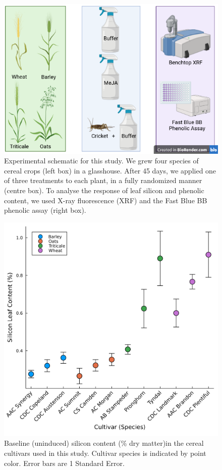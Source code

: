 \documentclass[12pt, letterpaper, ]{report}
\begin{document}
\begin{figure}[ht]
        \includegraphics[width = \textwidth]{images/Induction_schematic.png}
        \centering
        \caption{Experimental schematic for this study. We grew four species of cereal crops (left box) in a glasshouse. After 45 days, we applied one of three treatments to each plant, in a fully randomized manner (centre box). To analyse the response of leaf silicon and phenolic content, we used X-ray fluorescence (XRF) and the Fast Blue BB phenolic assay (right box).}
        \label{Fig:exp_design}
\end{figure}

\begin{figure}[h]
        \includegraphics[width = \textwidth]{images/spp_si_content.png}
        \centering
        \caption{Baseline (uninduced) silicon content (\% dry matter)in the cereal cultivars used in this study. Cultivar species is indicated by point color. Error bars are 1 Standard Error.}
        \label{Fig:baseline_si}
\end{figure}
\end{document}
